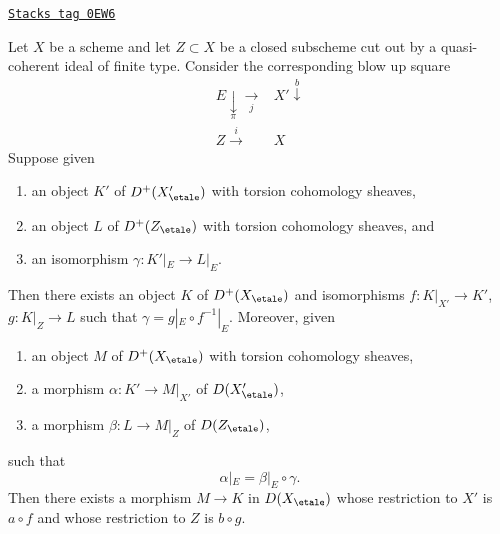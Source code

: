 \begin{lemma}
\label{etale-cohomology-lemma-blow-up-square-equivalence}
\href{https://stacks.math.columbia.edu/tag/0EW6}{\texttt{Stacks tag 0EW6}}

Let $X$ be a scheme and let $Z \subset X$ be a closed subscheme
cut out by a quasi-coherent ideal of finite type. Consider the
corresponding blow up square
$$
\begin{array}{cc}E \underset{\pi}{\downarrow}\underset{j}{\longrightarrow} & X' \overset{b}{\downarrow} \\ Z \overset{i}{\longrightarrow} & X\end{array}
$$
Suppose given
\begin{enumerate}
\item an object $K'$ of $D^+(X'_\etale)$ with torsion cohomology sheaves,
\item an object $L$ of $D^+(Z_\etale)$ with torsion cohomology sheaves, and
\item an isomorphism $\gamma : K'|_E \to L|_E$.
\end{enumerate}
Then there exists an object $K$ of $D^+(X_\etale)$
and isomorphisms $f : K|_{X'} \to K'$, $g : K|_Z \to L$ such
that $\gamma = g|_E \circ f^{-1}|_E$.
Moreover, given
\begin{enumerate}
\item an object $M$ of $D^+(X_\etale)$ with torsion cohomology sheaves,
\item a morphism $\alpha : K' \to M|_{X'}$ of $D(X'_\etale)$,
\item a morphism $\beta : L \to M|_Z$ of $D(Z_\etale)$,
\end{enumerate}
such that
$$
\alpha|_E  = \beta|_E \circ \gamma.
$$
Then there exists a morphism $M \to K$ in $D(X_\etale)$
whose restriction to $X'$ is $a \circ f$
and whose restriction to $Z$ is $b \circ g$.
\end{lemma}

